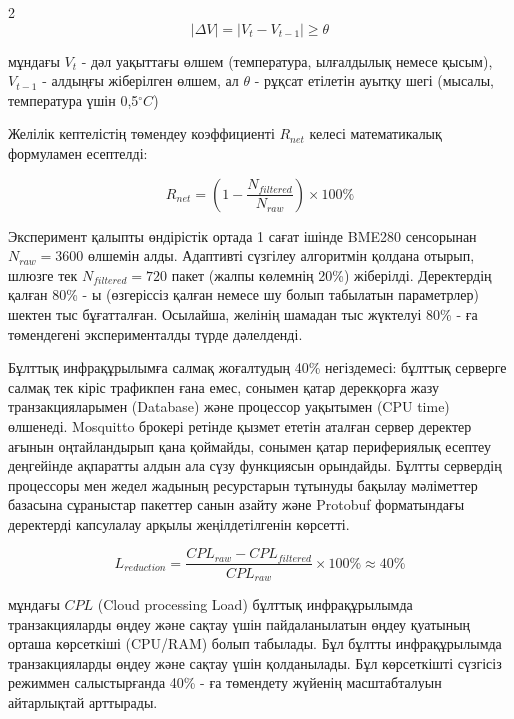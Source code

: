\begin{multicols}{2}
\begin{equation}
|\Delta V| = \left| V_{t} - V_{t - 1} \right| \geq \theta
\end{equation}

мұндағы \(V_{t}\) - дәл уақыттағы өлшем (температура, ылғалдылық немесе
қысым), \(V_{t - 1}\) - алдыңғы жіберілген өлшем, ал \(\theta\) - рұқсат
етілетін ауытқу шегі (мысалы, температура үшін 0,5\(^{\circ}C\))

Желілік кептелістің төмендеу коэффициенті \(R_{net}\) келесі
математикалық формуламен есептелді:

\begin{equation}
R_{net} = (1 - \frac{N_{filtered}}{N_{raw}}) \times 100\%
\end{equation}

Эксперимент қалыпты өндірістік ортада 1 сағат ішінде BME280 сенсорынан
\(N_{raw} = 3600\) өлшемін алды. Адаптивті сүзгілеу алгоритмін қолдана
отырып, шлюзге тек \(N_{filtered} = 720\) пакет (жалпы көлемнің 20\%)
жіберілді. Деректердің қалған 80\% - ы (өзгеріссіз қалған немесе шу
болып табылатын параметрлер) шектен тыс бұғатталған. Осылайша, желінің
шамадан тыс жүктелуі 80\% - ға төмендегені эксперименталды түрде
дәлелденді.

Бұлттық инфрақұрылымға салмақ жоғалтудың 40\% негіздемесі: бұлттық
серверге салмақ тек кіріс трафикпен ғана емес, сонымен қатар дерекқорға
жазу транзакцияларымен (Database) және процессор уақытымен (CPU time)
өлшенеді. Mosquitto брокері ретінде қызмет ететін аталған сервер
деректер ағынын оңтайландырып қана қоймайды, сонымен қатар перифериялық
есептеу деңгейінде ақпаратты алдын ала сүзу функциясын орындайды. Бұлтты
сервердің процессоры мен жедел жадының ресурстарын тұтынуды бақылау
мәліметтер базасына сұраныстар пакеттер санын азайту және Protobuf
форматындағы деректерді капсулалау арқылы жеңілдетілгенін көрсетті.

\begin{equation}
L_{reduction} = \frac{{CPL}_{raw} - {CPL}_{filtered}}{{CPL}_{raw}} \times 100\% \approx 40\%
\end{equation}

мұндағы \(CPL\) (Cloud processing Load) бұлттық инфрақұрылымда
транзакцияларды өңдеу және сақтау үшін пайдаланылатын өңдеу қуатының
орташа көрсеткіші (CPU/RAM) болып табылады. Бұл бұлтты инфрақұрылымда
транзакцияларды өңдеу және сақтау үшін қолданылады. Бұл көрсеткішті
сүзгісіз режиммен салыстырғанда 40\% - ға төмендету жүйенің
масштабталуын айтарлықтай арттырады.


\end{multicols}
